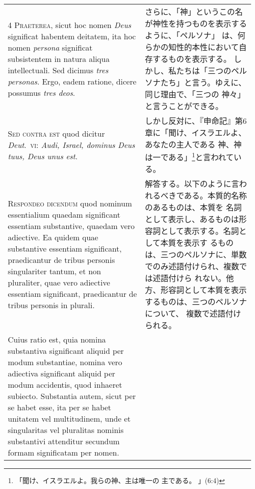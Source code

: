 \documentclass[10pt]{jsarticle} %
\begin{document}
\begin{longtable}{p{21em}p{21em}}
\\



4 {\scshape Praeterea}, sicut hoc nomen {\itshape Deus} significat habentem deitatem, ita hoc
nomen {\itshape persona} significat subsistentem in natura aliqua
intellectuali. Sed dicimus {\itshape tres personas}. Ergo, eadem ratione, dicere
possumus {\itshape tres deos}.


&

さらに、「神」というこの名が神性を持つものを表示するように、「ペルソナ」
 は、何らかの知性的本性において自存するものを表示する。
しかし、私たちは「三つのペルソナたち」と言う。ゆえに、同じ理由で、「三つの
 神々」と言うことができる。


\\



{\scshape Sed contra est} quod dicitur {\itshape Deut}.~{\scshape vi}: {\itshape Audi, Israel, dominus Deus tuus,
Deus unus est}.


&

しかし反対に、『申命記』第6章に「聞け、イスラエルよ、あなたの主人である
 神、神は一である」\footnote{「聞け、イスラエルよ。我らの神、主は唯一の
 主である。 」(6:4)}と言われている。



\\



{\scshape Respondeo dicendum} quod nominum essentialium quaedam significant
essentiam substantive, quaedam vero adiective. Ea quidem quae
substantive essentiam significant, praedicantur de tribus personis
singulariter tantum, et non pluraliter, quae vero adiective essentiam
significant, praedicantur de tribus personis in plurali. 


&

解答する。以下のように言われるべきである。本質的名称のあるものは、本質を
名詞として表示し、あるものは形容詞として表示する。名詞として本質を表示す
 るものは、三つのペルソナに、単数でのみ述語付けられ、複数では述語付けら
 れない。他方、形容詞として本質を表示するものは、三つのペルソナについて、
 複数で述語付けられる。

\\


Cuius ratio
est, quia nomina substantiva significant aliquid per modum substantiae,
nomina vero adiectiva significant aliquid per modum accidentis, quod
inhaeret subiecto. Substantia autem, sicut per se habet esse, ita per se
habet unitatem vel multitudinem, unde et singularitas vel pluralitas
nominis substantivi attenditur secundum formam significatam per
nomen. 




\end{longtable}
\end{document}
